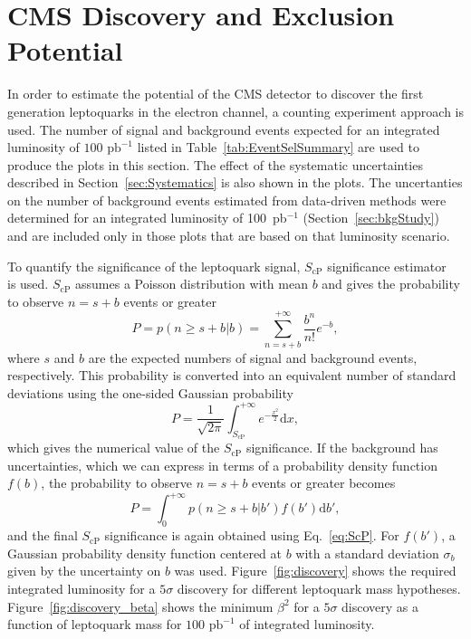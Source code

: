 %

\section{CMS Discovery and Exclusion Potential} \label{CMSpotential}

In order to estimate the potential of the CMS detector to discover the first generation leptoquarks
in the electron channel, a counting experiment approach is used. 
The number of signal and background events expected for an integrated luminosity of
$100\text{ pb}^{-1}$ listed in Table~\ref{tab:EventSelSummary} 
are used to produce the plots in this section.
The effect of the systematic uncertainties described in Section~\ref{sec:Systematics} is also shown in the plots. 
The uncertanties on the number of background events estimated from data-driven methods were determined for an integrated luminosity of 100~pb$^{-1}$
(Section~\ref{sec:bkgStudy}) and are included only in those plots that are based on that luminosity scenario.  


To quantify the significance of the
leptoquark signal, $S_\text{cP}$ significance estimator~\cite{ref:scp} is used. $S_\text{cP}$ assumes a Poisson distribution
with mean $b$ and gives the probability to observe $n=s+b$ events or greater
\begin{equation}
P = p(n\geq s+b|b) = \sum_{n=s+b}^{+\infty} \frac{b^n}{n!}e^{-b},
\end{equation}
where $s$ and $b$ are the expected numbers of signal and background events, respectively. This probability is 
converted into an equivalent number of standard deviations using the one-sided Gaussian probability
\begin{equation}
P = \frac{1}{\sqrt{2\pi}}\int_{S_\text{cP}}^{+\infty} e^{-\frac{x^2}{2}}\mathrm{d}x,
\label{eq:ScP}
\end{equation}
which gives the numerical value of the $S_\text{cP}$ significance. If the background has uncertainties, which we can express in terms of
a probability density function $f(b)$, the probability to observe $n=s+b$ events or greater becomes
\begin{equation}
P = \int_0^{+\infty} p(n\geq s+b|b')f(b')\mathrm{d}b',
\end{equation}
and the final $S_\text{cP}$ significance is again obtained using Eq.~\ref{eq:ScP}. For $f(b')$, a Gaussian probability density function
centered at $b$ with a standard deviation $\sigma_b$ given by the uncertainty on $b$ was used. 
Figure~\ref{fig:discovery} shows the required integrated luminosity for a $5\sigma$ discovery for different leptoquark mass hypotheses. 
Figure~\ref{fig:discovery_beta} shows the minimum $\beta^2$ for a $5\sigma$ discovery as a function of leptoquark mass for $100\text{ pb}^{-1}$ 
of integrated luminosity.

